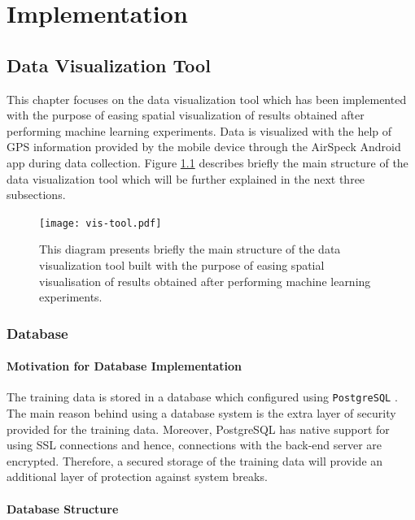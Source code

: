 \documentclass[bsc,frontabs,twoside,singlespacing, parskip,deptreport]{infthesis}     %
\begin{document}
\chapter{Implementation}

\section{Data Visualization Tool}
\label{sec:data-visualization-tool}

This chapter focuses on the data visualization tool which has been implemented with the purpose of easing spatial visualization of results obtained after performing machine learning experiments. Data is visualized with the help of GPS information provided by the mobile device through the AirSpeck Android app during data collection. Figure \ref{fig:vis-tool} describes briefly the main structure of the data visualization tool which will be further explained in the next three subsections.

\begin{figure}[h!]
  \center
  \texttt{[image: vis-tool.pdf]}
  \caption{This diagram presents briefly the main structure of the data visualization tool built with the purpose of easing spatial visualisation of results obtained after performing machine learning experiments.}
  \label{fig:vis-tool}
\end{figure}


\subsection{Database}
\label{subsec:database}

\subsubsection*{Motivation for Database Implementation}

The training data is stored in a database which configured using \texttt{PostgreSQL} \cite{postgres}. The main reason behind using a database system is the extra layer of security provided for the training data. Moreover, PostgreSQL has native support for using SSL connections and hence, connections with the back-end server are encrypted. Therefore, a secured storage of the training data will provide an additional layer of protection against system breaks.

\subsubsection*{Database Structure}
\end{document}
